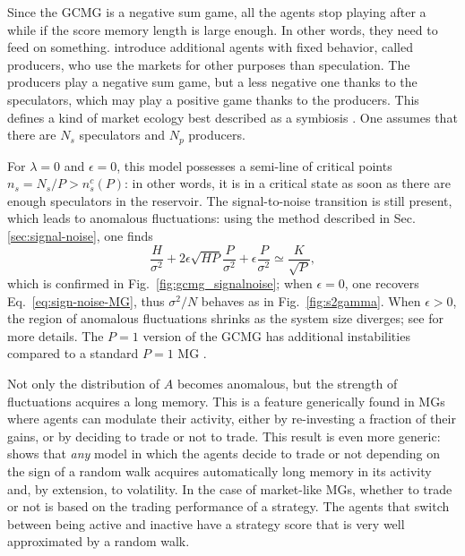 \documentclass[aps,twocolumn,nofootinbib,sortedaddress,reprint]{revtex4-1}
\begin{document}
Since the GCMG is a negative sum game, all the agents stop playing
after a while if the score memory length is large enough. In other
words, they need to feed on something. \textcite{MMM} introduce
additional agents with fixed behavior, called producers, who use the
markets for other purposes than speculation. The producers play a
negative sum game, but a less negative one thanks to the speculators,
which may play a positive game thanks to the producers. This defines a kind of market ecology
best described as a symbiosis \cite{MMM,ZMEM,CCMZ00}. One assumes that there are $N_s$ speculators and $N_p$ producers.

For $\lambda=0$ and $\epsilon=0$, this model possesses a semi-line of
critical points $n_s=N_s/P>n_s^c(P)$: in other words, it is in a critical state as soon as there are
enough speculators in the reservoir. The signal-to-noise transition is
still present, which leads to anomalous fluctuations: using the method
described in Sec. \ref{sec:signal-noise}, one finds
\begin{equation}
\frac{H}{\sigma^2}+2\epsilon\sqrt{{H}{P}}\frac{P}{\sigma^2}+\epsilon\frac{P}{\sigma^2}\simeq
\frac{K}{\sqrt{P}},
\label{eq:condvolclus}
\end{equation}
which is confirmed in Fig.~\ref{fig:gcmg_signalnoise}; when
$\epsilon=0$, one recovers Eq.~\eqref{eq:sign-noise-MG}, thus
$\sigma^2/N$ behaves as in Fig.~\ref{fig:s2gamma}. When $\epsilon>0$,
the region of anomalous fluctuations shrinks as the system size
diverges; see \textcite{CM03,galla2006anomalous} for more details.
The $P=1$ version of the GCMG has additional instabilities compared to
a standard $P=1$ MG \cite{CAM08}.

Not only the distribution of $A$ becomes anomalous, but the strength
of fluctuations acquires a long memory. This is a feature generically found in MGs where agents can modulate their activity, either by re-investing a fraction of their gains, or by deciding to trade or not to trade. This result is even more generic:  \textcite{BouchaudGiardina} shows that {\em any} model in which the agents decide to trade or not depending on the sign of a random walk acquires automatically long memory in its activity and, by extension, to volatility. In the case of market-like MGs, whether to trade or not is based on the trading performance of a strategy. The agents that switch between being active and inactive have a strategy score that is very well approximated by a random walk.
\end{document}
